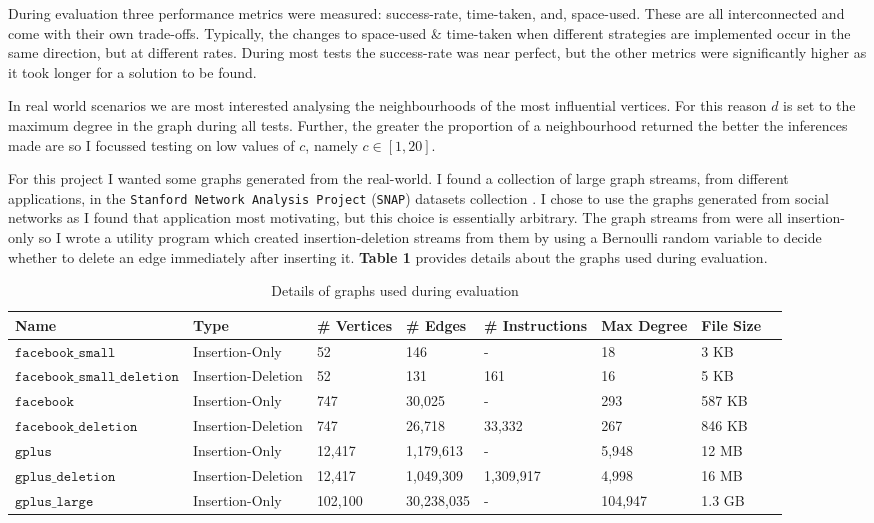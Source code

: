 \documentclass[11pt,twoside,a4paper]{report}
\begin{document}

During evaluation three performance metrics were measured: success-rate, time-taken, and, space-used. These are all interconnected and come with their own trade-offs. Typically, the changes to space-used \& time-taken when different strategies are implemented occur in the same direction, but at different rates. During most tests the success-rate was near perfect, but the other metrics were significantly higher as it took longer for a solution to be found.

\par In real world scenarios we are most interested analysing the neighbourhoods of the most influential vertices. For this reason $d$ is set to the maximum degree in the graph during all tests. Further, the greater the proportion of a neighbourhood returned the better the inferences made are so I focussed testing on low values of $c$, namely $c\in[1,20]$.

\par For this project I wanted some graphs generated from the real-world. I found a collection of large graph streams, from different applications, in the \texttt{Stanford Network Analysis Project} (\texttt{SNAP}) datasets collection \cite{SNAP}. I chose to use the graphs generated from social networks as I found that application most motivating, but this choice is essentially arbitrary. The graph streams from \cite{SNAP} were all insertion-only so I wrote a utility program which created insertion-deletion streams from them by using a Bernoulli random variable to decide whether to delete an edge immediately after inserting it. \textbf{Table 1} provides details about the graphs used during evaluation.

\begin{center}
	\begin{table}[h]
		\tiny
		\begin{tabular}{|l|l|l|l|l|l|l|l|}
			\hline
			\textbf{Name}&\textbf{Type}&\textbf{\# Vertices}&\textbf{\# Edges}&\textbf{\# Instructions}&\textbf{Max Degree}&\textbf{File Size}\\
			\hline
			$\mathtt{facebook\_small}$&Insertion-Only&52&146&-&18&3 KB\\
			$\mathtt{facebook\_small\_deletion}$&Insertion-Deletion&52&131&161&16&5 KB\\
			$\mathtt{facebook}$&Insertion-Only&747&30,025&-&293&587 KB\\
			$\mathtt{facebook\_deletion}$&Insertion-Deletion&747&26,718&33,332&267&846 KB\\
			$\mathtt{gplus}$&Insertion-Only&12,417&1,179,613&-&5,948&12 MB\\
			$\mathtt{gplus\_deletion}$&Insertion-Deletion&12,417&1,049,309&1,309,917&4,998&16 MB\\
			$\mathtt{gplus\_large}$&Insertion-Only&102,100&30,238,035&-&104,947&1.3 GB\\
			\hline
		\end{tabular}
    \caption{Details of graphs used during evaluation}
	\end{table}
\end{center}
\end{document}
